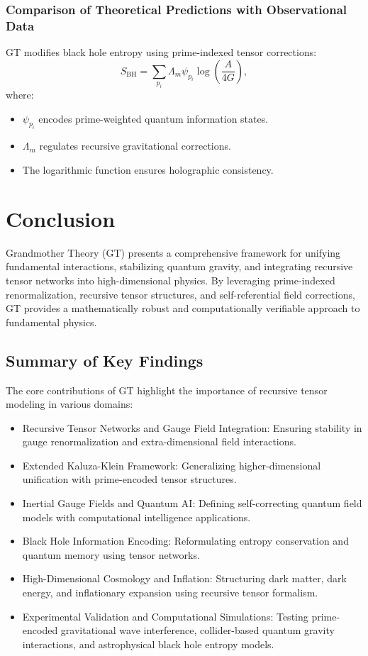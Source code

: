 \documentclass{article}
\theoremstyle{plain}
\begin{document}
\subsubsection{Comparison of Theoretical Predictions with Observational Data}
GT modifies black hole entropy using prime-indexed tensor corrections:
\begin{equation}
    S_{\text{BH}} = \sum_{p_i} \Lambda_m \psi_{p_i} \log \left( \frac{A}{4G} \right),
\end{equation}
where:
\begin{itemize}
    \item $\psi_{p_i}$ encodes prime-weighted quantum information states.
    \item $\Lambda_m$ regulates recursive gravitational corrections.
    \item The logarithmic function ensures holographic consistency.
\end{itemize}

\section{Conclusion}

Grandmother Theory (GT) presents a comprehensive framework for unifying fundamental interactions, stabilizing quantum gravity, and integrating recursive tensor networks into high-dimensional physics. By leveraging prime-indexed renormalization, recursive tensor structures, and self-referential field corrections, GT provides a mathematically robust and computationally verifiable approach to fundamental physics.

\subsection{Summary of Key Findings}
The core contributions of GT highlight the importance of recursive tensor modeling in various domains:
\begin{itemize}
    \item Recursive Tensor Networks and Gauge Field Integration: Ensuring stability in gauge renormalization and extra-dimensional field interactions.
    \item Extended Kaluza-Klein Framework: Generalizing higher-dimensional unification with prime-encoded tensor structures.
    \item Inertial Gauge Fields and Quantum AI: Defining self-correcting quantum field models with computational intelligence applications.
    \item Black Hole Information Encoding: Reformulating entropy conservation and quantum memory using tensor networks.
    \item High-Dimensional Cosmology and Inflation: Structuring dark matter, dark energy, and inflationary expansion using recursive tensor formalism.
    \item Experimental Validation and Computational Simulations: Testing prime-encoded gravitational wave interference, collider-based quantum gravity interactions, and astrophysical black hole entropy models.
\end{itemize}
\end{document}
